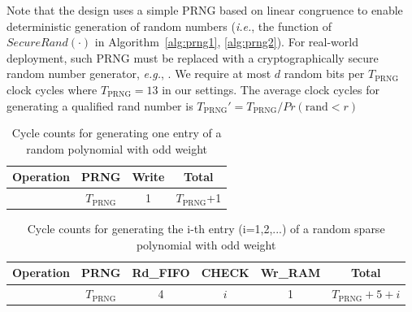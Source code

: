 \documentclass[runningheads]{llncs}
\begin{document}

Note that the design uses a simple PRNG based on linear congruence to enable deterministic generation of random numbers (\textit{i.e.}, the function of $SecureRand(\cdot)$ in Algorithm~\ref{alg:prng1}, \ref{alg:prng2}). For real-world deployment,
such PRNG must be replaced with a cryptographically secure random number
generator, \textit{e.g.}, \cite{laue2007compact,cherkaoui2013very}. We require at most $d$ random bits per $T_{\text{PRNG}}$ clock cycles where $T_{\text{PRNG}}=13$ in our settings.
The average clock cycles for generating a qualified rand number is $T_{\text{PRNG}}' = T_{\text{PRNG}}/Pr(\text{rand} < r)$

\begin{table}[!tb]\centering
\caption{Cycle counts for generating  one entry of a random polynomial with odd weight}
\begin{tabular}{c|c|c|c}
  \hline
  Operation & PRNG & Write & Total \\\hline
   & $T_{\text{PRNG}}$ & 1  & $T_{\text{PRNG}}$+1 \\
  \hline
\end{tabular}
\vspace{-4mm}
\end{table}

\begin{table}[!tb]\centering
\caption{Cycle counts for generating  the i-th entry (i=1,2,...) of a random sparse polynomial with odd weight}
\begin{tabular}{c|c|c|c|c|c}
  \hline
  Operation & PRNG & Rd\_FIFO & CHECK &Wr\_RAM & Total \\\hline
   & $T_{\text{PRNG}}$ & 4  & $i$ & 1 &$T_{\text{PRNG}}+5+i$ \\
  \hline
\end{tabular}
\vspace{-4mm}
\end{table}
\end{document}

